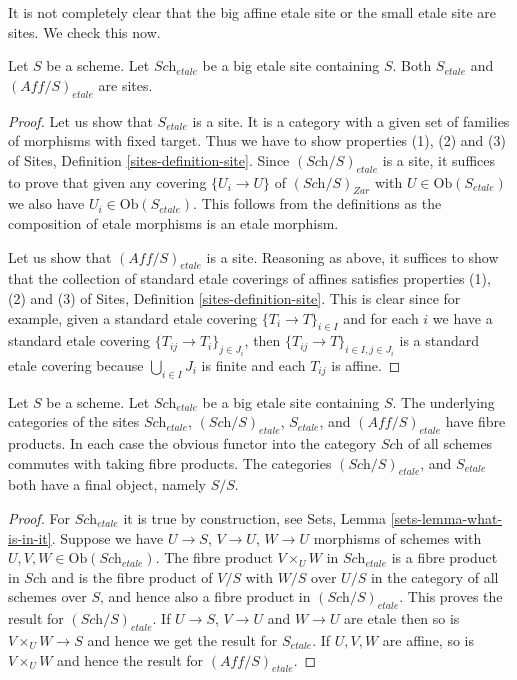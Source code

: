 \noindent
It is not completely clear that
the big affine etale site or the small etale site are sites.
We check this now.

\begin{lemma}
\label{lemma-verify-site-etale}
Let $S$ be a scheme. Let $\textit{Sch}_{etale}$ be a big etale
site containing $S$.
Both $S_{etale}$ and $(\textit{Aff}/S)_{etale}$ are sites.
\end{lemma}

\begin{proof}
Let us show that $S_{etale}$ is a site. It is a category with a
given set of families of morphisms with fixed target. Thus we
have to show properties (1), (2) and (3) of
Sites, Definition \ref{sites-definition-site}.
Since $(\textit{Sch}/S)_{etale}$ is a site, it suffices to prove
that given any covering $\{U_i \to U\}$ of $(\textit{Sch}/S)_{Zar}$
with $U \in \text{Ob}(S_{etale})$ we also have $U_i \in \text{Ob}(S_{etale})$.
This follows from the definitions as the composition of etale morphisms
is an etale morphism.

\medskip\noindent
Let us show that $(\textit{Aff}/S)_{etale}$ is a site.
Reasoning as above, it suffices to show that the collection
of standard etale coverings of affines satisfies properties
(1), (2) and (3) of
Sites, Definition \ref{sites-definition-site}.
This is clear since for example, given a standard etale
covering $\{T_i \to T\}_{i\in I}$ and for each
$i$ we have a standard etale covering $\{T_{ij} \to T_i\}_{j\in J_i}$, then
$\{T_{ij} \to T\}_{i \in I, j\in J_i}$ is a standard etale covering
because $\bigcup_{i\in I} J_i$ is finite and each $T_{ij}$ is affine.
\end{proof}

\begin{lemma}
\label{lemma-fibre-products-etale}
Let $S$ be a scheme. Let $\textit{Sch}_{etale}$ be a big etale
site containing $S$. The underlying categories of the sites
$\textit{Sch}_{etale}$, $(\textit{Sch}/S)_{etale}$,
$S_{etale}$, and $(\textit{Aff}/S)_{etale}$ have fibre products.
In each case the obvious functor into the category $\textit{Sch}$ of
all schemes commutes with taking fibre products. The categories
$(\textit{Sch}/S)_{etale}$, and $S_{etale}$ both have a final object,
namely $S/S$.
\end{lemma}

\begin{proof}
For $\textit{Sch}_{etale}$ it is true by construction, see
Sets, Lemma \ref{sets-lemma-what-is-in-it}.
Suppose we have $U \to S$, $V \to U$, $W \to U$ morphisms
of schemes with $U, V, W \in \text{Ob}(\textit{Sch}_{etale})$.
The fibre product $V \times_U W$ in $\textit{Sch}_{etale}$
is a fibre product in $\textit{Sch}$ and
is the fibre product of $V/S$ with $W/S$ over $U/S$ in
the category of all schemes over $S$, and hence also a
fibre product in $(\textit{Sch}/S)_{etale}$.
This proves the result for $(\textit{Sch}/S)_{etale}$.
If $U \to S$, $V \to U$ and $W \to U$ are etale then so is
$V \times_U W \to S$ and hence we get the result for $S_{etale}$.
If $U, V, W$ are affine, so is $V \times_U W$ and hence the
result for $(\textit{Aff}/S)_{etale}$.
\end{proof}

